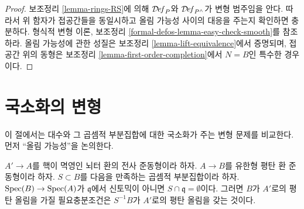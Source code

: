 \begin{proof}
보조정리 \ref{lemma-rings-RS}에 의해 $\mathcal{D}\!\mathit{ef}_P$와
$\mathcal{D}\!\mathit{ef}_{P^\wedge}$가 변형 범주임을 안다. 따라서 위 함자가
접공간들을 동일시하고 올림 가능성 사이의 대응을 주는지 확인하면
충분하다. 형식적 변형 이론, 보조정리
\ref{formal-defos-lemma-easy-check-smooth}를 참조하라. 올림 가능성에 관한
성질은 보조정리 \ref{lemma-lift-equivalence}에서 증명되며, 접공간 위의
동형은 보조정리 \ref{lemma-first-order-completion}에서 $N = B$인
특수한 경우이다.
\end{proof}



\section{국소화의 변형}
\label{section-compare-localization}

\noindent
이 절에서는 대수와 그 곱셈적 부분집합에 대한 국소화가 주는 변형 문제를
비교한다. 먼저 ``올림 가능성''을 논의한다.

\begin{lemma}
\label{lemma-lift-equivalence-localization}
$A' \to A$를 핵이 멱영인 뇌터 환의 전사 준동형이라 하자.
$A \to B$를 유한형 평탄 환 준동형이라 하자. $S \subset B$를 다음을
만족하는 곱셈적 부분집합이라 하자. $\mathop{\mathrm{Spec}}(B) \to \mathop{\mathrm{Spec}}(A)$가
$\mathfrak q$에서 신토믹이 아니면 $S \cap \mathfrak q = \emptyset$이다.
그러면 $B$가 $A'$로의 평탄 올림을 가질 필요충분조건은 $S^{-1}B$가
$A'$로의 평탄 올림을 갖는 것이다.
\end{lemma}

